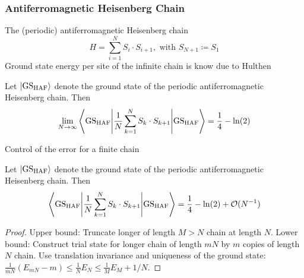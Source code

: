\documentclass{beamer}[10]
\renewcommand{\braket}[1]{\left\langle#1\right\rangle}
\begin{document}
\begin{frame}
	\frametitle{Antiferromagnetic Heisenberg Chain}
	The (periodic) antiferromagnetic Heisenberg chain 
	$$
	H=\sum_{i=1}^{N}S_i\cdot S_{i+1}, \text{ with } S_{N+1}\coloneqq S_1
	$$
 Ground state energy per site of the infinite chain is know due to Hulthen
 \begin{lemma} \label{LemmaHeisenbergChainThermodynamicGSEnergy}
 	Let $ \ket{\textnormal{GS}_{\textnormal{HAF}}} $ denote the ground state of the periodic antiferromagnetic Heisenberg chain. Then\begin{equation}
 		\lim\limits_{N\to\infty}\braket{\textnormal{GS}_{\textnormal{HAF}}\Bigg\vert\frac{1}{N}\sum_{k=1}^N S_k\cdot S_{k+1} \Bigg\vert \textnormal{GS}_{\textnormal{HAF}}}=\frac{1}{4}-\ln(2) 
 	\end{equation}
 \end{lemma}
\end{frame}

\begin{frame}
	Control of the error for a finite chain
	\begin{lemma}\label{LemmaHeisenbergChainFiniteNEstimate}
		Let $ \ket{\textnormal{GS}_{\textnormal{HAF}}} $ denote the ground state of the periodic antiferromagnetic Heisenberg chain. Then\begin{equation}
			\braket{\textnormal{GS}_{\textnormal{HAF}}\Bigg\vert\frac{1}{N}\sum_{k=1}^N S_k\cdot S_{k+1} \Bigg\vert \textnormal{GS}_{\textnormal{HAF}}}=\frac{1}{4}-\ln(2) +\mathcal{O}(N^{-1})
		\end{equation}
	\end{lemma}
\begin{proof}
	Upper bound: Truncate longer of length $M>N$ chain at length $N$.
	Lower bound: Construct trial state for longer chain of length $mN$ by $m$ copies of length $N$ chain. Use translation invariance and uniqueness of the ground state:
	$\frac{1}{mN}(E_{mN}-m)\leq\frac1N E_N\leq \frac{1}{M}E_M+1/N$.
\end{proof}
\end{frame}
\end{document}
